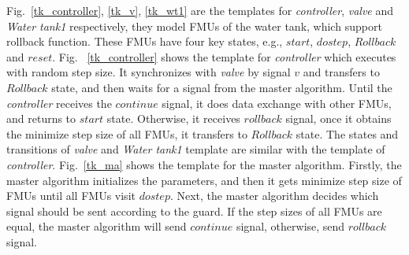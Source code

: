 \begin{figure}[htbp]
\end{figure}

Fig.~\ref{tk_controller}, \ref{tk_v}, \ref{tk_wt1} are the templates for \emph{controller}, \emph{valve} and \emph{Water tank1} respectively, they model FMUs of the water tank,  which support rollback function. These FMUs have four key states, e.g., $start$, $dostep$, $Rollback$ and $reset$. Fig.~ \ref{tk_controller} shows the template for \emph{controller} which executes with random step size. It synchronizes with \emph{valve} by signal $v$ and transfers to $Rollback$ state, and then waits for a signal from the master algorithm. Until the \emph{controller} receives the $continue$ signal, it does data exchange with other FMUs, and returns to $start$ state. Otherwise, it receives $rollback$ signal, once it obtains the minimize step size of all FMUs, it transfers to $Rollback$ state. The states and transitions of \emph{valve} and \emph{Water tank1} template are similar with the template of \emph{controller}. Fig.~\ref{tk_ma} shows the template for the master algorithm. Firstly, the master algorithm initializes the parameters, and then it gets minimize step size of FMUs until all FMUs visit $dostep$. Next, the master algorithm decides which signal should be sent according to the guard. If the step sizes of all FMUs are equal, the master algorithm will send $continue$ signal, otherwise, send $rollback$ signal.

